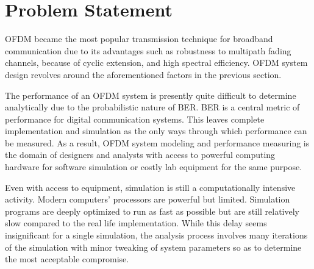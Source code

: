 
\section{Problem Statement}
\gls{OFDM} became the most popular transmission technique for broadband communication due to its advantages such as robustness to multipath fading channels, because of cyclic extension, and high spectral efficiency\cite{wireless_design}. \gls{OFDM} system design revolves around the aforementioned factors in the previous section.

The performance of an \gls{OFDM} system is presently quite difficult to determine analytically due to the probabilistic nature of \gls{BER}. \gls{BER} is a central metric of performance for digital communication systems. This leaves complete implementation and simulation as the only ways through which performance can be measured. As a result, \gls{OFDM} system modeling and performance measuring is the domain of designers and analysts with access to powerful computing hardware for software simulation or costly lab equipment for the same purpose.

Even with access to equipment, simulation is still a computationally intensive activity. Modern computers' processors are powerful but limited. Simulation programs are deeply optimized to run as fast as possible but are still relatively slow compared to the real life implementation. While this delay seems insignificant for a single simulation, the analysis process involves many iterations of the simulation with minor tweaking of system parameters so as to determine the most acceptable compromise.
 

